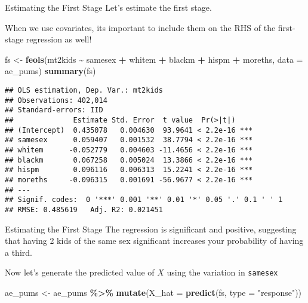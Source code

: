 \documentclass[
  ignorenonframetext,
]{beamer}
\newenvironment{Shaded}{\begin{snugshade}}{\end{snugshade}}
\newcommand{\AttributeTok}[1]{\textcolor[rgb]{0.13,0.29,0.53}{#1}}
\newcommand{\FunctionTok}[1]{\textcolor[rgb]{0.13,0.29,0.53}{\textbf{#1}}}
\newcommand{\NormalTok}[1]{#1}
\newcommand{\OtherTok}[1]{\textcolor[rgb]{0.56,0.35,0.01}{#1}}
\newcommand{\SpecialCharTok}[1]{\textcolor[rgb]{0.81,0.36,0.00}{\textbf{#1}}}
\newcommand{\StringTok}[1]{\textcolor[rgb]{0.31,0.60,0.02}{#1}}
\begin{document}
\begin{frame}[fragile]{Estimating the First Stage}
\label{estimating-the-first-stage}
Let's estimate the first stage.

When we use covariates, its important to include them on the RHS of the
first-stage regression as well!

\tiny

\begin{Shaded}
\begin{Highlighting}[]
\NormalTok{fs }\OtherTok{\textless{}{-}} \FunctionTok{feols}\NormalTok{(mt2kids }\SpecialCharTok{\textasciitilde{}}\NormalTok{ samesex }\SpecialCharTok{+}\NormalTok{ whitem }\SpecialCharTok{+}\NormalTok{ blackm }\SpecialCharTok{+}\NormalTok{ hispm }\SpecialCharTok{+}\NormalTok{ moreths,}
            \AttributeTok{data =}\NormalTok{ ae\_pums)}
\FunctionTok{summary}\NormalTok{(fs)}
\end{Highlighting}
\end{Shaded}

\begin{verbatim}
## OLS estimation, Dep. Var.: mt2kids
## Observations: 402,014
## Standard-errors: IID 
##              Estimate Std. Error  t value  Pr(>|t|)    
## (Intercept)  0.435078   0.004630  93.9641 < 2.2e-16 ***
## samesex      0.059407   0.001532  38.7794 < 2.2e-16 ***
## whitem      -0.052779   0.004603 -11.4656 < 2.2e-16 ***
## blackm       0.067258   0.005024  13.3866 < 2.2e-16 ***
## hispm        0.096116   0.006313  15.2241 < 2.2e-16 ***
## moreths     -0.096315   0.001691 -56.9677 < 2.2e-16 ***
## ---
## Signif. codes:  0 '***' 0.001 '**' 0.01 '*' 0.05 '.' 0.1 ' ' 1
## RMSE: 0.485619   Adj. R2: 0.021451
\end{verbatim}
\end{frame}

\begin{frame}[fragile]{Estimating the First Stage}
\label{estimating-the-first-stage-1}
The regression is significant and positive, suggesting that having 2
kids of the same sex significant increases your probability of having a
third.

Now let's generate the predicted value of \(X\) using the variation in
\texttt{samesex}

\scriptsize

\begin{Shaded}
\begin{Highlighting}[]
\NormalTok{ae\_pums }\OtherTok{\textless{}{-}}\NormalTok{ ae\_pums }\SpecialCharTok{\%\textgreater{}\%}
  \FunctionTok{mutate}\NormalTok{(}\AttributeTok{X\_hat =} \FunctionTok{predict}\NormalTok{(fs, }\AttributeTok{type =} \StringTok{"response"}\NormalTok{))}
\end{Highlighting}
\end{Shaded}
\end{frame}
\end{document}
